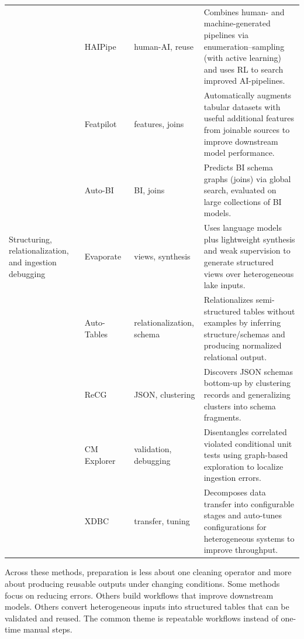 \documentclass[sigconf,nonacm]{acmart}
\begin{document}
\begin{table}[!htbp]
\begin{tabularx}{\textwidth}{@{}p{24mm}p{28mm}p{18mm}Y@{}}
~ &
HAIPipe~\cite{10.1145/3588945} &
human-AI, reuse &
Combines human- and machine-generated pipelines via enumeration--sampling (with active learning) and uses RL to search improved AI-pipelines. \\

~ &
Featpilot~\cite{11113027} &
features, joins &
Automatically augments tabular datasets with useful additional features from joinable sources to improve downstream model performance. \\

~ &
Auto-BI~\cite{10.14778/3603581.3603596} &
BI, joins &
Predicts BI schema graphs (joins) via global search, evaluated on large collections of BI models. \\

\midrule

Structuring, relationalization, and ingestion debugging &
Evaporate~\cite{10.14778/3626292.3626294} &
views, synthesis &
Uses language models plus lightweight synthesis and weak supervision to generate structured views over heterogeneous lake inputs. \\

~ &
Auto-Tables~\cite{10.1145/3665252.3665269} &
relationalization, schema &
Relationalizes semi-structured tables without examples by inferring structure/schemas and producing normalized relational output. \\

~ &
ReCG~\cite{10.14778/3681954.3682019} &
JSON, clustering &
Discovers JSON schemas bottom-up by clustering records and generalizing clusters into schema fragments. \\

~ &
CM Explorer~\cite{10.14778/3611540.3611595} &
validation, debugging &
Disentangles correlated violated conditional unit tests using graph-based exploration to localize ingestion errors. \\

~ &
XDBC~\cite{10.1145/3725294} &
transfer, tuning &
Decomposes data transfer into configurable stages and auto-tunes configurations for heterogeneous systems to improve throughput. \\

\bottomrule
\end{tabularx}
\end{table}

Across these methods, preparation is less about one cleaning operator and more about producing reusable outputs under changing conditions. Some methods focus on reducing errors. Others build workflows that improve downstream models. Others convert heterogeneous inputs into structured tables that can be validated and reused. The common theme is repeatable workflows instead of one-time manual steps.
\end{document}
